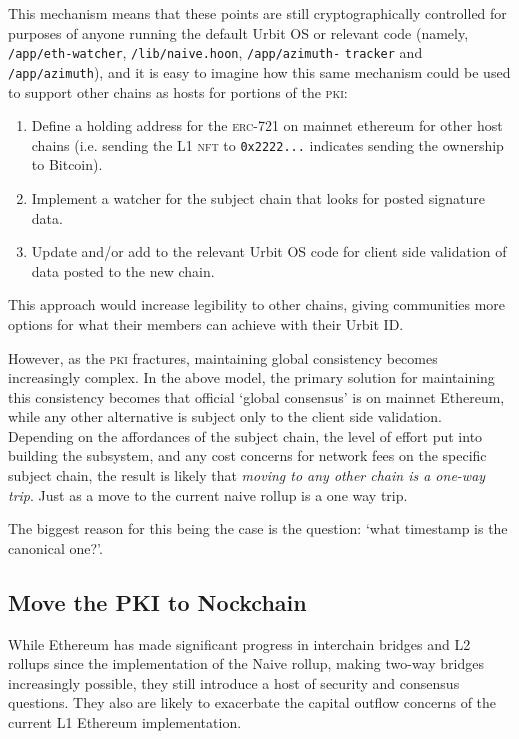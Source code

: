\documentclass[twoside]{article}
\begin{document}
\sloppy
This mechanism means that these points are still cryptographically controlled for purposes of anyone running the \mbox{default} Urbit OS or relevant code (namely, \lstinline[style=inlinecode]{/app/eth-watcher}, \lstinline[style=inlinecode]{/lib/naive.hoon}, \lstinline[style=inlinecode]{/app/azimuth-} \lstinline[style=inlinecode]{tracker} and \lstinline[style=inlinecode]{/app/azimuth}), and it is easy to imagine how this same mechanism could be used to support other chains as hosts for portions of the \textsc{pki}:

\begin{enumerate}
  \item  Define a holding address for the \textsc{erc}-721 on mainnet ethereum for other host chains (i.e. sending the L1 \textsc{nft} to \lstinline[style=inlinecode]{0x2222...} indicates sending the ownership to Bitcoin).
  \item  Implement a watcher for the subject chain that looks for posted signature data.
  \item  Update and/or add to the relevant Urbit OS code for client side validation of data posted to the new chain.
\end{enumerate}

\noindent
This approach would increase legibility to other chains, giving communities more options for what their members can achieve with their Urbit ID. 

However, as the \textsc{pki} fractures, maintaining global consistency becomes increasingly complex. In the above model, the primary solution for maintaining this consistency becomes that official `global consensus' is on mainnet Ethereum, while any other alternative is subject only to the client side validation. Depending on the affordances of the subject chain, the level of effort put into building the subsystem, and any cost concerns for network fees on the specific subject chain, the result is likely that \emph{moving to any other chain is a one-way trip}. Just as a move to the current naive rollup is a one way trip.

The biggest reason for this being the case is the question: `what timestamp is the canonical one?'. 

\subsection[Move the \textsc{pki} to Nockchain]{Move the PKI to Nockchain}

While Ethereum has made significant progress in interchain bridges and L2 rollups since the implementation of the Naive rollup, making two-way bridges increasingly possible, they still introduce a host of security and consensus questions. They also are likely to exacerbate the capital outflow concerns of the current L1 Ethereum implementation.
\end{document}
